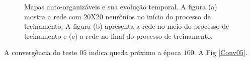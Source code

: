 \begin{figure}[H]
	\centering
	\qquad
	\qquad
	\qquad
	\caption{Mapas auto-organizáveis e sua evolução temporal. A figura (a) mostra a rede com $20$X$20$ neurônios no início do processo de treinamento. A figura (b) apresenta a rede no meio do processo de treinamento e (c) a rede no final do processo de treinamento.}
	\label{SOMt05}
\end{figure}

A convergência do teste $05$ indica queda próximo a época $100$. A Fig \ref{Conv05}. 

